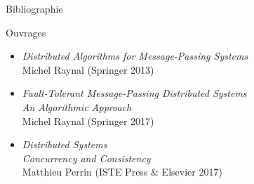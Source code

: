 
\begingroup

\begin{frame}{Bibliographie}

  \begin{block}{Ouvrages}
    \begin{itemize}
    \item
      \textit{Distributed Algorithms for Message-Passing Systems}\\
      Michel Raynal (Springer 2013)
    \item
      \textit{Fault-Tolerant Message-Passing Distributed Systems}\\
      \textit{An Algorithmic Approach}\\
      Michel Raynal (Springer 2017)
    \item
      \textit{Distributed Systems}\\
      \textit{Concurrency and Consistency}\\
      Matthieu Perrin (ISTE Press \& Elsevier 2017)
    \end{itemize}
  \end{block}
  
  
\end{frame}

\endgroup
\endinput
